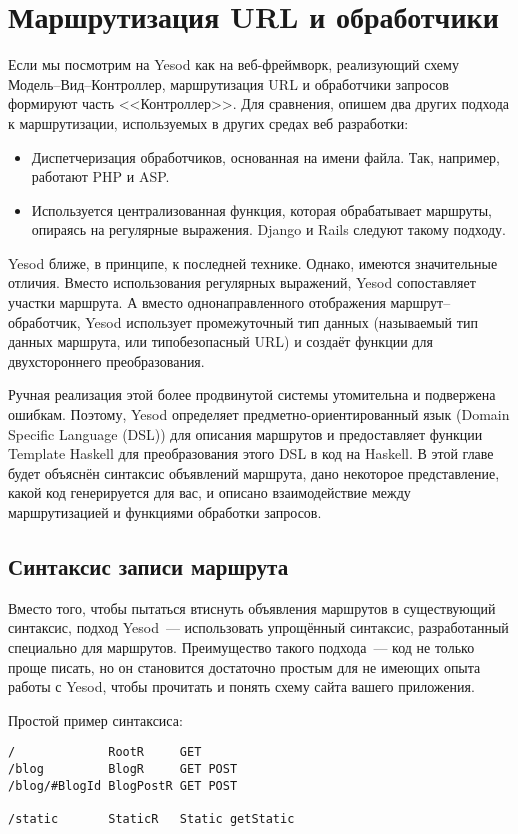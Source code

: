 \chapter{Маршрутизация URL и обработчики}\label{ch:routing}
Если мы посмотрим на Yesod как на веб-фреймворк, реализующий схему
Модель--Вид--Контроллер, маршрутизация URL и обработчики запросов
формируют часть <<Контроллер>>. Для сравнения, опишем два других
подхода к маршрутизации, используемых в других средах веб разработки:
\begin{itemize}
\item Диспетчеризация обработчиков, основанная на имени файла. Так,
  например, работают PHP и ASP.

\item Используется централизованная функция, которая обрабатывает
  маршруты, опираясь на регулярные выражения. Django и Rails
  следуют такому подходу.
\end{itemize}

Yesod ближе, в принципе, к последней технике. Однако, имеются
значительные отличия. Вместо использования регулярных выражений, Yesod
сопоставляет участки маршрута. А вместо однонаправленного отображения
маршрут--обработчик, Yesod использует промежуточный тип данных
(называемый тип данных маршрута, или типобезопасный URL) и создаёт
функции для двухстороннего преобразования.

Ручная реализация этой более продвинутой системы утомительна и
подвержена ошибкам. Поэтому, Yesod определяет предметно-ориентированный
язык (Domain Specific Language (DSL)) для описания маршрутов и
предоставляет функции Template Haskell для преобразования этого DSL в
код на Haskell. В этой главе будет объяснён синтаксис объявлений
маршрута, дано некоторое представление, какой код генерируется для
вас, и описано взаимодействие между маршрутизацией и функциями
обработки запросов.

\section{Синтаксис записи маршрута}
Вместо того, чтобы пытаться втиснуть объявления маршрутов в
существующий синтаксис, подход Yesod~--- использовать упрощённый
синтаксис, разработанный специально для маршрутов. Преимущество такого
подхода~--- код не только проще писать, но он становится достаточно
простым для не имеющих опыта работы с Yesod, чтобы прочитать и понять
схему сайта вашего приложения.

Простой пример синтаксиса:
\begin{verbatim}
/             RootR     GET
/blog         BlogR     GET POST
/blog/#BlogId BlogPostR GET POST

/static       StaticR   Static getStatic
\end{verbatim}

